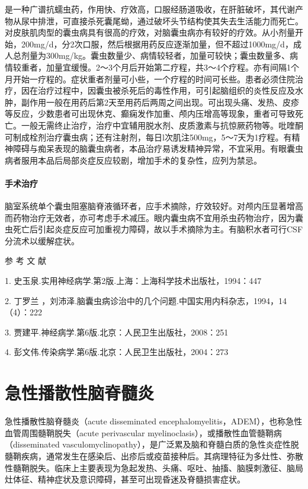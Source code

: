 是一种广谱抗蠕虫药，作用快、疗效高，口服经肠道吸收，在肝脏破坏，其代谢产物从尿中排泄，可直接杀死囊尾蚴，通过破坏头节结构使其失去生活能力而死亡。对皮肤肌肉型的囊虫病具有很高的疗效，对脑囊虫病亦有较好的疗效。从小剂量开始，200mg/d，分2次口服，然后根据用药反应逐渐加量，但不超过1000mg/d，成人总剂量为300mg/kg。囊虫数量少、病情较轻者，加量可较快；囊虫数量多、病情较重者，加量宜缓慢。2～3个月后开始第二疗程，共3～4个疗程。亦有间隔1个月开始一疗程的。症状重者剂量可小些，一个疗程的时间可长些。患者必须住院治疗，因在治疗过程中，因囊虫被杀死后的毒性作用，可引起脑组织的炎性反应及水肿，副作用一般在用药后第2天至用药后两周之间出现。可出现头痛、发热、皮疹等反应，少数患者可出现休克、癫痫发作加重、颅内压增高等现象，重者可导致死亡。一般无需终止治疗，治疗中宜辅用脱水剂、皮质激素与抗惊厥药物等。吡喹酮可制成栓剂治疗囊虫病；还有注射剂，每日l次肌注500mg，5～7天为1疗程。有精神障碍与痴呆表现的脑囊虫病者，本品治疗易诱发精神异常，不宜采用。有眼囊虫病者服用本品后局部炎症反应较剧，增加手术的复杂性，应列为禁忌。

\subsubsection{手术治疗}

脑室系统单个囊虫阻塞脑脊液循环者，应手术摘除，疗效较好。对颅内压显著增高而药物治疗无效者，亦可考虑手术减压。眼内囊虫病不宜用杀虫药物治疗，因为囊虫死亡后引起炎症反应可加重视力障碍，故以手术摘除为主。有脑积水者可行CSF分流术以缓解症状。

\protect\hypertarget{text00255.html}{}{}

\hypertarget{text00255.htmlux5cux23CHP8-5-4}{}
参 考 文 献

1. 史玉泉.实用神经病学.第2版.上海：上海科学技术出版社，1994：447

2. 丁罗兰
，刘沛泽.脑囊虫病诊治中的几个问题.中国实用内科杂志，1994，14（4）：222

3. 贾建平.神经病学.第6版.北京：人民卫生出版社，2008：251

4. 彭文伟.传染病学.第6版.北京：人民卫生出版社，2004：273

\protect\hypertarget{text00256.html}{}{}

\chapter{急性播散性脑脊髓炎}

急性播散性脑脊髓炎（acute disseminated
encephalomyelitis，ADEM），也称急性血管周围髓鞘脱失（acute perivascular
myelinoclasis），或播散性血管髓鞘病（disseminated
vasculomyclinopathy），是广泛累及脑和脊髓白质的急性炎症性脱髓鞘疾病，通常发生在感染后、出疹后或疫苗接种后。其病理特征为多灶性、弥散性髓鞘脱失。临床上主要表现为急起发热、头痛、呕吐、抽搐、脑膜刺激征、脑局灶体征、精神症状及意识障碍，甚至可出现昏迷及脊髓损害症状。

